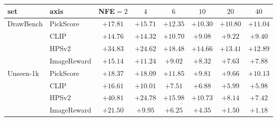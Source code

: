 \begin{center}
\small
\begin{tabular}{llcccccc}
\toprule
set & axis & NFE$=2$ & $4$ & $6$ & $10$ & $20$ & $40$\\
\midrule
\multirow{4}{*}{DrawBench}
 & PickScore    & $+17.81$ & $+15.71$ & $+12.35$ & $+10.30$ & $+10.80$ & $+11.04$\\
 & CLIP         & $+14.76$ & $+14.32$ & $+10.70$ & $+9.08$ & $+9.22$ & $+9.40$\\
 & HPSv2        & $+34.83$ & $+24.62$ & $+18.48$ & $+14.66$ & $+13.41$ & $+12.89$\\
 & ImageReward  & $+15.14$ & $+11.24$ & $+9.02$ & $+8.32$ & $+7.63$ & $+7.88$\\
\midrule
\multirow{4}{*}{Unseen-1k}
 & PickScore    & $+18.37$ & $+18.09$ & $+11.85$ & $+9.81$ & $+9.66$ & $+10.13$\\
 & CLIP         & $+16.61$ & $+10.01$ & $+7.51$ & $+6.88$ & $+5.99$ & $+5.98$\\
 & HPSv2        & $+40.81$ & $+24.78$ & $+15.98$ & $+10.73$ & $+8.14$ & $+7.42$\\
 & ImageReward  & $+21.50$ & $+9.95$ & $+6.25$ & $+4.35$ & $+1.50$ & $+1.18$\\
\bottomrule
\end{tabular}
\end{center}

